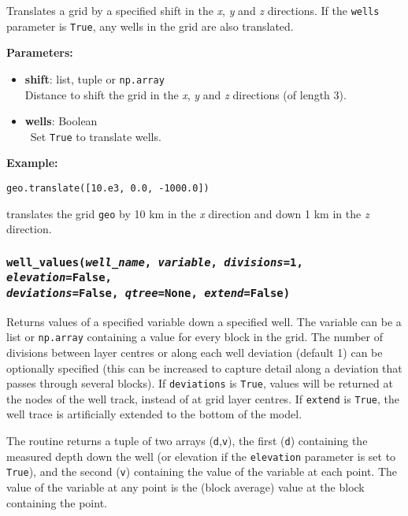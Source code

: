 Translates a grid by a specified shift in the \emph{x}, \emph{y} and \emph{z} directions.  If the \texttt{wells} parameter is \texttt{True}, any wells in the grid are also translated.

\textbf{Parameters:}
\begin{itemize}
  \item \textbf{shift}: list, tuple or \texttt{np.array}\\
    Distance to shift the grid in the \emph{x}, \emph{y} and \emph{z} directions (of length 3).
  \item \textbf{wells}: Boolean\\\
    Set \texttt{True} to translate wells.
\end{itemize}

\textbf{Example:}

\begin{lstlisting}
geo.translate([10.e3, 0.0, -1000.0])
\end{lstlisting}

translates the grid \texttt{geo} by 10 km in the \emph{x} direction and down 1 km in the \emph{z} direction.

\begin{snugshade}
\subsubsection{\texttt{well\_values(\emph{well\_name}, \emph{variable}, \emph{divisions}=1, \emph{elevation}=\texttt{False}, \\
    \emph{deviations}=\texttt{False}, \emph{qtree}=None, \emph{extend}=\texttt{False})}}
\end{snugshade}
\label{sec:mulgrid:well_values}

Returns values of a specified variable down a specified well.  The variable can be a list or \texttt{np.array} containing a value for every block in the grid.  The number of divisions between layer centres or along each well deviation (default 1) can be optionally specified (this can be increased to capture detail along a deviation that passes through several blocks).  If \texttt{deviations} is \texttt{True}, values will be returned at the nodes of the well track, instead of at grid layer centres.  If \texttt{extend} is \texttt{True}, the well trace is artificially extended to the bottom of the model.

The routine returns a tuple of two arrays (\texttt{d},\texttt{v}), the first (\texttt{d}) containing the measured depth down the well (or elevation if the \texttt{elevation} parameter is set to \texttt{True}), and the second (\texttt{v}) containing the value of the variable at each point.  The value of the variable at any point is the (block average) value at the block containing the point.

